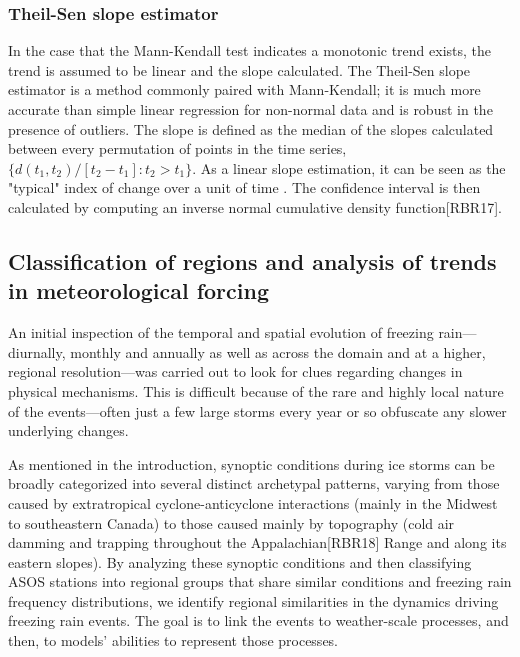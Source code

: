 \documentclass[twocol]{ametsoc}
\begin{document}
\subsubsection{Theil-Sen slope estimator}
In the case that the Mann-Kendall test indicates a monotonic trend exists, the trend is assumed to be linear and the slope calculated. The Theil-Sen slope estimator is a method commonly paired with Mann-Kendall; it is much more accurate than simple linear regression for non-normal data and is robust in the presence of outliers. The slope is defined as the median of the slopes calculated between every permutation of points in the time series, $\{d(t_1,t_2)/[t_2-t_1]:t_2>t_1\}$. As a linear slope estimation, it can be seen as the "typical" index of change over a unit of time \citep{chandler2011statistical}. The confidence interval is then calculated by computing an inverse normal cumulative density function[RBR17].

\subsection{Classification of regions and analysis of trends in meteorological forcing}
An initial inspection of the temporal and spatial evolution of freezing rain---diurnally, monthly and annually as well as across the domain and at a higher, regional resolution---was carried out to look for clues regarding changes in physical mechanisms.  This is difficult because of the rare and highly local nature of the events---often just a few large storms every year or so obfuscate any slower underlying changes.

As mentioned in the introduction, synoptic conditions during ice storms can be broadly categorized into several distinct archetypal patterns, varying from those caused by extratropical cyclone-anticyclone interactions (mainly in the Midwest to southeastern Canada) to those caused mainly by topography (cold air damming and trapping throughout the Appalachian[RBR18] Range and along its eastern slopes). By analyzing these synoptic conditions and then classifying ASOS stations into regional groups that share similar conditions and freezing rain frequency distributions, we identify regional similarities in the dynamics driving freezing rain events. The goal is to link the events to weather-scale processes, and then, to models' abilities to represent those processes.
\end{document}

